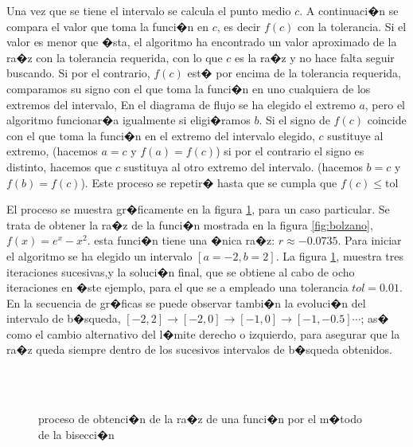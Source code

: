  Una vez que se tiene el intervalo se calcula el punto medio $c$. A continuaci�n se compara el valor que toma la funci�n en $c$, es decir $f(c)$ con la tolerancia. Si el valor es menor que �sta, el algoritmo ha encontrado un valor aproximado de la ra�z con la tolerancia requerida, con lo que $c$ es la ra�z y no hace falta seguir buscando. Si por el contrario, $f(c)$ est� por encima de la tolerancia requerida, comparamos su signo con el que toma la funci�n en uno cualquiera de los extremos del intervalo, En el diagrama de flujo se ha elegido el extremo $a$, pero el algoritmo funcionar�a igualmente si eligi�ramos $b$. Si el signo de $f(c)$ coincide con el que toma la funci�n en el extremo del intervalo elegido, $c$ sustituye al extremo, (hacemos $a=c$ y $f(a)=f(c)$) si por el contrario el signo es distinto, hacemos que $c$ sustituya al otro extremo del intervalo. (hacemos $b=c$ y $f(b)=f(c)$). Este proceso se repetir� hasta que se cumpla que $f(c)\le \text{tol}$ 

El proceso se muestra gr�ficamente en la figura \ref{fig:bisec}, para un caso particular. Se trata de obtener la ra�z de la funci�n mostrada en la figura \ref{fig:bolzano}, $f(x)=e^x-x^2$. esta funci�n tiene una �nica ra�z: $r\approx -0.0735$. Para iniciar el algoritmo se ha elegido un intervalo $[a=-2,b=2]$. La figura \ref{fig:bisec}, muestra tres iteraciones sucesivas,y la soluci�n final, que se obtiene al cabo de ocho iteraciones en �ste ejemplo, para el que se a empleado una tolerancia $tol=0.01$. En la secuencia de gr�ficas se puede observar tambi�n la evoluci�n del intervalo de b�squeda, $[-2, 2]\rightarrow [-2, 0] \rightarrow [-1, 0] \rightarrow [-1, -0.5] \cdots$; as� como el cambio alternativo del l�mite derecho o izquierdo, para asegurar que la ra�z queda siempre dentro de los sucesivos intervalos de b�squeda obtenidos. 
\begin{figure}
\centering
{} \qquad
{}\\
\qquad
{}\\

\caption{proceso de obtenci�n de la ra�z de una funci�n por el m�todo de la bisecci�n }
\label{fig:bisec}
\end{figure}


